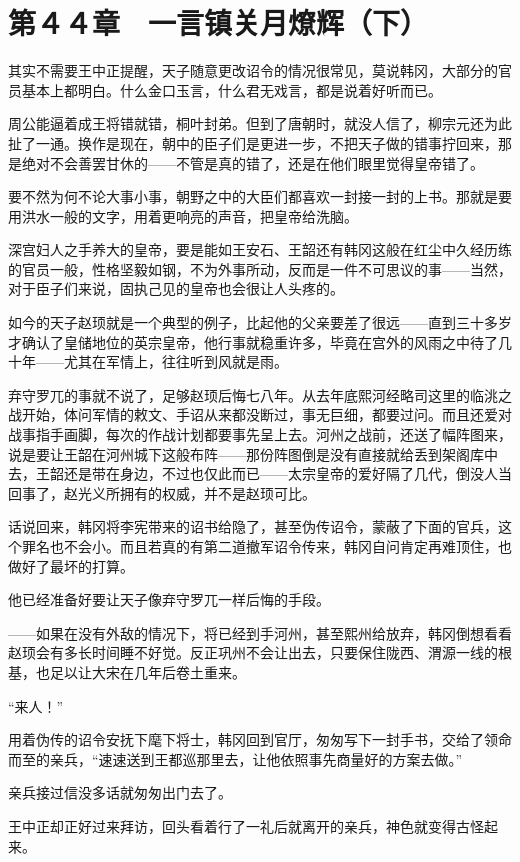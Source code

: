 \section{第４４章　一言镇关月燎辉（下）}

其实不需要王中正提醒，天子随意更改诏令的情况很常见，莫说韩冈，大部分的官员基本上都明白。什么金口玉言，什么君无戏言，都是说着好听而已。

周公能逼着成王将错就错，桐叶封弟。但到了唐朝时，就没人信了，柳宗元还为此扯了一通。换作是现在，朝中的臣子们是更进一步，不把天子做的错事拧回来，那是绝对不会善罢甘休的——不管是真的错了，还是在他们眼里觉得皇帝错了。

要不然为何不论大事小事，朝野之中的大臣们都喜欢一封接一封的上书。那就是要用洪水一般的文字，用着更响亮的声音，把皇帝给洗脑。

深宫妇人之手养大的皇帝，要是能如王安石、王韶还有韩冈这般在红尘中久经历练的官员一般，性格坚毅如钢，不为外事所动，反而是一件不可思议的事——当然，对于臣子们来说，固执己见的皇帝也会很让人头疼的。

如今的天子赵顼就是一个典型的例子，比起他的父亲要差了很远——直到三十多岁才确认了皇储地位的英宗皇帝，他行事就稳重许多，毕竟在宫外的风雨之中待了几十年——尤其在军情上，往往听到风就是雨。

弃守罗兀的事就不说了，足够赵顼后悔七八年。从去年底熙河经略司这里的临洮之战开始，体问军情的敕文、手诏从来都没断过，事无巨细，都要过问。而且还爱对战事指手画脚，每次的作战计划都要事先呈上去。河州之战前，还送了幅阵图来，说是要让王韶在河州城下这般布阵——那份阵图倒是没有直接就给丢到架阁库中去，王韶还是带在身边，不过也仅此而已——太宗皇帝的爱好隔了几代，倒没人当回事了，赵光义所拥有的权威，并不是赵顼可比。

话说回来，韩冈将李宪带来的诏书给隐了，甚至伪传诏令，蒙蔽了下面的官兵，这个罪名也不会小。而且若真的有第二道撤军诏令传来，韩冈自问肯定再难顶住，也做好了最坏的打算。

他已经准备好要让天子像弃守罗兀一样后悔的手段。

——如果在没有外敌的情况下，将已经到手河州，甚至熙州给放弃，韩冈倒想看看赵顼会有多长时间睡不好觉。反正巩州不会让出去，只要保住陇西、渭源一线的根基，也足以让大宋在几年后卷土重来。

“来人！”

用着伪传的诏令安抚下麾下将士，韩冈回到官厅，匆匆写下一封手书，交给了领命而至的亲兵，“速速送到王都巡那里去，让他依照事先商量好的方案去做。”

亲兵接过信没多话就匆匆出门去了。

王中正却正好过来拜访，回头看着行了一礼后就离开的亲兵，神色就变得古怪起来。

